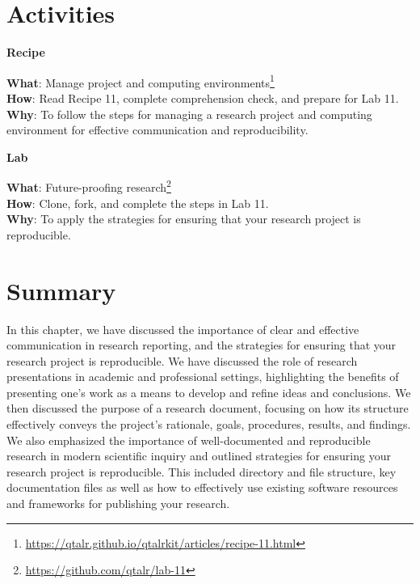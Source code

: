 \documentclass[
  letterpaper,
]{latex/krantz}
\theoremstyle{definition}
\theoremstyle{remark}
\DeclareRobustCommand{\href}[2]{#2\footnote{\url{#1}}}
\begin{document}
\section*{Activities}\label{activities-9}


\begin{tcolorbox}[enhanced jigsaw, toprule=.15mm, breakable, colback=white, opacityback=0, leftrule=.75mm, bottomrule=.15mm, colframe=quarto-callout-color-frame, left=2mm, arc=.35mm, rightrule=.15mm]

\textbf{ Recipe}

\textbf{What}:
\href{https://qtalr.github.io/qtalrkit/articles/recipe-11.html}{Manage
project and computing environments}\\
\textbf{How}: Read Recipe 11, complete comprehension check, and prepare
for Lab 11.\\
\textbf{Why}: To follow the steps for managing a research project and
computing environment for effective communication and reproducibility.

\end{tcolorbox}

\begin{tcolorbox}[enhanced jigsaw, toprule=.15mm, breakable, colback=white, opacityback=0, leftrule=.75mm, bottomrule=.15mm, colframe=quarto-callout-color-frame, left=2mm, arc=.35mm, rightrule=.15mm]

\textbf{ Lab}

\textbf{What}: \href{https://github.com/qtalr/lab-11}{Future-proofing
research}\\
\textbf{How}: Clone, fork, and complete the steps in Lab 11.\\
\textbf{Why}: To apply the strategies for ensuring that your research
project is reproducible.

\end{tcolorbox}

\section*{Summary}\label{summary-10}


In this chapter, we have discussed the importance of clear and effective
communication in research reporting, and the strategies for ensuring
that your research project is reproducible. We have discussed the role
of research presentations in academic and professional settings,
highlighting the benefits of presenting one's work as a means to develop
and refine ideas and conclusions. We then discussed the purpose of a
research document, focusing on how its structure effectively conveys the
project's rationale, goals, procedures, results, and findings. We also
emphasized the importance of well-documented and reproducible research
in modern scientific inquiry and outlined strategies for ensuring your
research project is reproducible. This included directory and file
structure, key documentation files as well as how to effectively use
existing software resources and frameworks for publishing your research.
\end{document}
